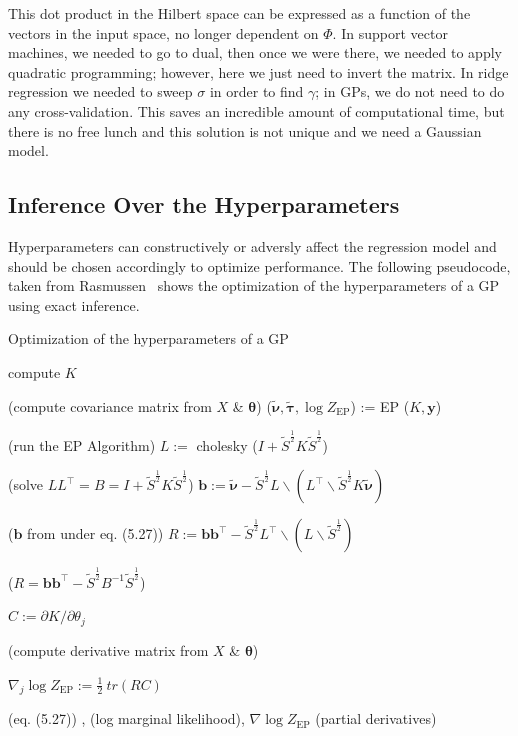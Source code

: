 \documentclass[journal]{IEEEtran}
\makeatletter
\newenvironment{pseudocode}[1][htb]{%
    \renewcommand{\ALG@name}{Pseudocode}%
   \begin{algorithm}[#1]%
  }{\end{algorithm}}
\makeatother
\begin{document}
This dot product in the Hilbert space can be expressed as a function of the vectors in the input space, no longer dependent on \(\Phi\). In support vector machines, we needed to go to dual, then once we were there, we needed to apply quadratic programming; however, here we just need to invert the matrix. In ridge regression we needed to sweep \(\sigma\) in order to find \(\gamma\); in GPs, we do not need to do any cross-validation. This saves an incredible amount of computational time, but there is no free lunch and this solution is not unique and we need a Gaussian model.

\subsection{Inference Over the Hyperparameters}
Hyperparameters can constructively or adversly affect the regression model and should be chosen accordingly to optimize performance. The following pseudocode, taken from Rasmussen~\cite{Rasmussen} shows the optimization of the hyperparameters of a GP using exact inference.

\begin{pseudocode}
    \caption{Optimization of the hyperparameters of a GP}
    \begin{algorithmic}[1]
    \State compute \(K\) 
    
    \quad(compute covariance matrix from \(X\) \& \(\bm{\theta}\))
    \State (\(\bm{\tilde{\nu}}, \bm{\tilde{\tau}}, \log{Z_{\text{EP}}}\)) := EP (\(K, \mathbf{y}\))

    \quad(run the EP Algorithm)
    \State \(L :=\) cholesky (\(I + \tilde{S}^{\frac{1}{2}}K\tilde{S}^{\frac{1}{2}}\))

    \quad(solve \(LL^\top = B = I + \tilde{S}^{\frac{1}{2}}K\tilde{S}^{\frac{1}{2}}\))
    \State \(\mathbf{b}:= \bm{\tilde{\nu}} - \tilde{S}^{\frac{1}{2}} L \backslash (L^\top \backslash \tilde{S}^{\frac{1}{2}} K \bm{\tilde{\nu}})\)

    \quad(\(\mathbf{b}\) from under eq. (5.27))
    \State \(R := \mathbf{bb}^\top - \tilde{S}^{\frac{1}{2}} L^\top \backslash (L \backslash \tilde{S}^{\frac{1}{2}} )\)

    \quad (\(R = \mathbf{bb}^\top - \tilde{S}^{\frac{1}{2}} B^{-1} \tilde{S}^{\frac{1}{2}} \))
    
        \(C := \partial{K} / \partial{\theta_j} \)

        \quad (compute derivative matrix from \(X\) \& \(\bm{\theta}\))

        \( \nabla_j \log{Z_\text{EP}} := \frac{1}{2}\ tr(RC) \)

        \quad (eq. (5.27))
    \EndFor
    \EndInput
    , (log marginal likelihood), \( \nabla \log{Z_\text{EP}}\) (partial derivatives)
    \end{algorithmic}
\end{pseudocode}
\end{document}

